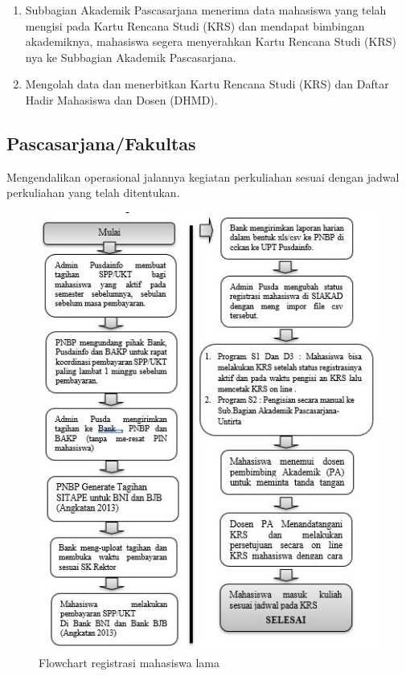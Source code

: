 \documentclass[
]{book}
\providecommand{\tightlist}{%
  \setlength{\itemsep}{0pt}\setlength{\parskip}{0pt}}
\begin{document}
\begin{enumerate}
\def\labelenumi{\arabic{enumi}.}
\tightlist
\item
  Subbagian Akademik Pascasarjana menerima data mahasiswa yang telah mengisi pada Kartu Rencana Studi (KRS) dan mendapat bimbingan akademiknya, mahasiswa segera menyerahkan Kartu Rencana
  Studi (KRS) nya ke Subbagian Akademik Pascasarjana.
\item
  Mengolah data dan menerbitkan Kartu Rencana Studi (KRS) dan Daftar Hadir Mahasiswa dan Dosen (DHMD).
\end{enumerate}

\hypertarget{pascasarjanafakultas}{%
\subsection{Pascasarjana/Fakultas}\label{pascasarjanafakultas}}

Mengendalikan operasional jalannya kegiatan perkuliahan sesuai dengan jadwal perkuliahan yang telah ditentukan.

\begin{figure}
\centering
\includegraphics{static/3.94.JPG}
\caption{Flowchart registrasi mahasiswa lama}
\end{figure}
\end{document}
